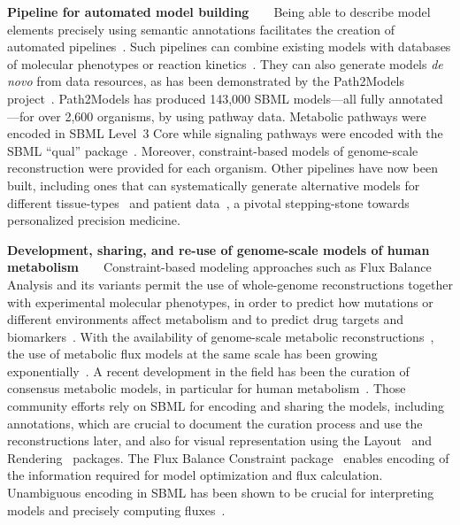 \documentclass{sbml-paper}
\begin{document}
\textbf{Pipeline for automated model building}~~~~Being able to describe model elements precisely using semantic annotations facilitates the creation of automated pipelines~\citep{Drager2010automating}. Such pipelines can combine existing models with databases of molecular phenotypes or reaction kinetics~\citep{li2010systematic}.  They can also generate models \emph{de novo} from data resources, as has been demonstrated by the Path2Models project~\citep{buchel2013path2models}. Path2Models has produced 143,000 SBML models---all fully annotated---for over 2,600 organisms, by using pathway data. Metabolic pathways were encoded in SBML Level~3 Core while signaling pathways were encoded with the SBML ``qual'' package~\citep{chaouiya2013sbml}. Moreover, constraint-based models of genome-scale reconstruction were provided for each organism. Other pipelines have now been built, including ones that can systematically generate alternative models for different tissue-types~\citep{wang2012reconstruction,thiele2013community} and patient data~\citep{uhlen2017pathology}, a pivotal stepping-stone towards personalized precision medicine.

\textbf{Development, sharing, and re-use of genome-scale models of human metabolism}~~~~Constraint-based modeling approaches such as Flux Balance Analysis and its variants permit the use of whole-genome reconstructions together with experimental molecular phenotypes, in order to predict how mutations or different environments affect metabolism and to predict drug targets and biomarkers~\citep{savinell1992network, obrien2015}.  With the availability of genome-scale metabolic reconstructions~\citep{edwards1999systems}, the use of metabolic flux models at the same scale has been growing exponentially~\citep{Bordbar2014a}. A recent development in the field has been the curation of consensus metabolic models, in particular for human metabolism~\citep{brunk2018}. Those community efforts rely on SBML for encoding and sharing the models, including annotations, which are crucial to document the curation process and use the reconstructions later, and also for visual representation using the Layout~\citep{Gauges2015} and Rendering~\citep{Bergmann2018sbml} packages. The Flux Balance Constraint package~\citep{Olivier2018a} enables encoding of the information required for model optimization and flux calculation.  Unambiguous encoding in SBML has been shown to be crucial for interpreting models and precisely computing fluxes~\citep{Ebrahim2015, Ravikrishnan2015critical}.
\end{document}
